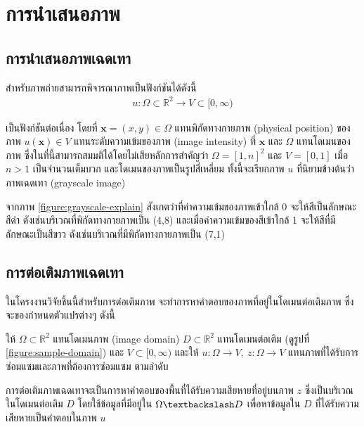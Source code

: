 \section{การนำเสนอภาพ}
\subsection{การนำเสนอภาพเฉดเทา}

\hspace{1cm} สำหรับภาพถ่ายสามารถพิจารณาภาพเป็นฟังก์ชันได้ดังนี้
\begin{align*}
    u : \Omega \subset \mathbb{R}^2 \rightarrow V \subset [0,\infty)	
\end{align*}

\hspace{1cm} เป็นฟังก์ชันต่อเนื่อง โดยที่ $ \mathbf{x} = (x,y) \in \Omega $ แทนพิกัดทางกายภาพ (physical position) ของภาพ $ u(\mathbf{x}) \in V $ แทนระดับความเข้มของภาพ (image intensity) ที่ $ \mathbf{x} $ และ $ \Omega $ แทนโดเมนของภาพ ซึ่งในที่นี้สามารถสมมติได้โดยไม่เสียหลักการสำคัญว่า $ \Omega = [1,n]^2 $ และ $ V = [0,1] $ เมื่อ $n>1$ เป็นจำนวนเต็มบวก และโดเมนของภาพเป็นรูปสี่เหลี่ยม ทั้งนี้จะเรียกภาพ $u$ ที่นิยามข้างต้นว่าภาพเฉดเทา (grayscale image)



\hspace{1cm} จากภาพ \ref{figure:grayscale-explain} สังเกตว่าที่ค่าความเข้มของภาพเข้าใกล้ 0 จะให้สีเป็นลักษณะสีดำ ดังเช่นบริเวณที่พิกัดทางกายภาพเป็น (4,8) และเมื่อค่าความเข้มของสีเข้าใกล้ 1 จะให้สีที่มีลักษณะเป็นสีขาว ดังเช่นบริเวณที่มีพิกัดทางกายภาพเป็น (7,1)

\subsection{การต่อเติมภาพเฉดเทา}
\hspace{1cm} ในโครงงานวิจัยชิ้นนี้สำหรับการต่อเติมภาพ จะทำการหาคำตอบของภาพที่อยู่ในโดเมนต่อเติมภาพ ซึ่งจะของกำหนดตัวแปรต่างๆ ดังนี้

\hspace{1cm} ให้ $\Omega \subset \mathbb{R}^2$ แทนโดเมนภาพ (image domain) $D \subset \mathbb{R}^2$ แทนโดเมนต่อเติม (ดูรูปที่ \ref{figure:sample-domain}) และ $V \subset [0,\infty)$ และให้ $ u: \Omega \rightarrow V,\ z: \Omega \rightarrow V$ แทนภาพที่ได้รับการซ่อมแซมและภาพที่ต้องการซ่อมแซม ตามลำดับ



\hspace{1cm} การต่อเติมภาพเฉดเทาจะเป็นการหาคำตอบของพื้นที่ได้รับความเสียหายที่อยู่บนภาพ $z$ ซึ่งเป็นบริเวณในโดเมนต่อเติม $D$ โดยใช้ข้อมูลที่มีอยู่ใน $\Omega \textbackslash D$ เพื่อหาข้อมูลใน $D$ ที่ได้รับความเสียหายเป็นคำตอบในภาพ $u$

